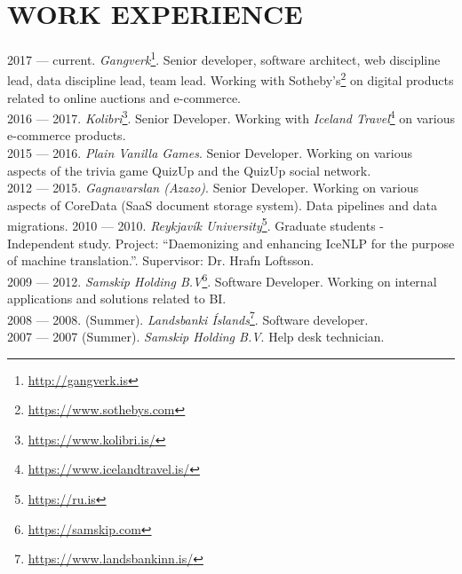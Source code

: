 \section{WORK EXPERIENCE}
2017 --- current. \emph{Gangverk}\footnote{\url{http://gangverk.is}}. Senior developer, software architect, web discipline lead, data discipline lead, team lead. Working with Sotheby's\footnote{\url{https://www.sothebys.com}} on digital products related to online auctions and e-commerce.\\
2016 --- 2017. \emph{Kolibri}\footnote{\url{https://www.kolibri.is/}}. Senior Developer. Working with \emph{Iceland Travel}\footnote{\url{https://www.icelandtravel.is/}} on various e-commerce products.\\
2015 --- 2016. \emph{Plain Vanilla Games}. Senior Developer. Working on various aspects of the trivia game QuizUp and the QuizUp social network.\\
2012 --- 2015. \emph{Gagnavarslan (Azazo)}. Senior Developer. Working on various aspects of CoreData (SaaS document storage system). Data pipelines and data migrations.
2010 --- 2010. \emph{Reykjavík University}\footnote{\url{https://ru.is}}. Graduate students - Independent study. Project: ``Daemonizing and enhancing IceNLP for the purpose of machine translation.''. Supervisor: Dr. Hrafn Loftsson.\\
2009 --- 2012. \emph{Samskip Holding B.V}\footnote{\url{https://samskip.com}}. Software Developer. Working on internal applications and solutions related to BI.\\
2008 --- 2008. (Summer). \emph{Landsbanki Íslands}\footnote{\url{https://www.landsbankinn.is/}}. Software developer.\\
2007 --- 2007 (Summer). \emph{Samskip Holding B.V}. Help desk technician.

